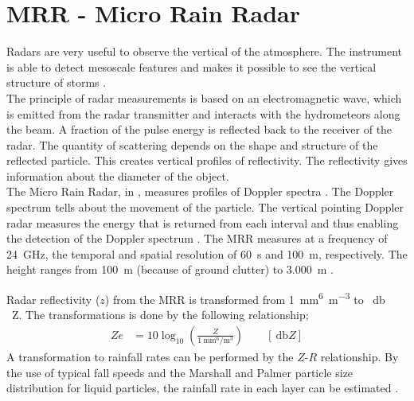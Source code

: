 \section{MRR - Micro Rain Radar}\label{sec:MRR}

Radars are very useful to observe the vertical of the atmosphere. The instrument is able to detect mesoscale features and makes it possible to see the vertical structure of storms \citep{markowski_mesoscale_2011}.\\
The principle of radar measurements is based on an electromagnetic wave, which is emitted from the radar transmitter and interacts with the hydrometeors along the beam. A fraction of the pulse energy is reflected back to the receiver of the radar. The quantity of scattering depends on the shape and structure of the reflected particle. This creates vertical profiles of reflectivity. The reflectivity gives information about the diameter of the object. 
\\
The Micro Rain Radar, in , measures profiles of Doppler spectra \citep{metek_micro_2010}. The Doppler spectrum tells about the movement of the particle. The vertical pointing Doppler radar measures the energy that is returned from each interval and thus enabling the detection of the Doppler spectrum \citep{lecuyer_aos_2017}. The MRR measures at a frequency of \SI{24}{\giga\Hz}, the temporal and spatial resolution of \SI{60}{\second} and \SI{100}{\metre}, respectively. The height ranges from \SI{100}{\metre} (because of ground clutter) to \SI{3.000}{\metre} \citep{metek_micro_2010}.

\newline \newline
\noindent 
Radar reflectivity ($z$) from the MRR is transformed from \SI{1}{\mm^6\per\metre^3} to \SI{}{\decibel\,Z}.
The transformations is done by the following relationship;
\begin{align}
Ze & = 10 \log_{10} \left(\frac{Z}{\SI{1}{\mm^6\per\metre^3}}\right) \qquad [\SI{}{\decibel Z}]
\label{eq:Ze}
\end{align}
A transformation to rainfall rates can be performed by the $Z$-$R$ relationship. By the use of typical fall speeds and the Marshall and Palmer particle size distribution for liquid particles, the rainfall rate in each layer can be estimated \citep{rinehart_radar_2010}. 
